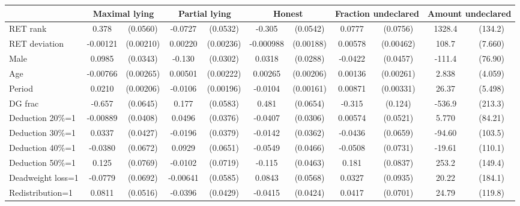 \begin{tabular}{l|cccccc|cc|cc}
                &\multicolumn{2}{c}{Maximal lying}&\multicolumn{2}{c}{Partial lying}&\multicolumn{2}{c}{Honest}  &\multicolumn{2}{c}{Fraction undeclared}&\multicolumn{2}{c}{Amount undeclared}\\
\hline
RET rank        &    0.378\sym{***}& (0.0560)&  -0.0727         & (0.0532)&   -0.305\sym{***}& (0.0542)&   0.0777         & (0.0756)&   1328.4\sym{***}&  (134.2)\\
RET deviation   & -0.00121         &(0.00210)&  0.00220         &(0.00236)&-0.000988         &(0.00188)&  0.00578         &(0.00462)&    108.7\sym{***}&  (7.660)\\
Male            &   0.0985\sym{***}& (0.0343)&   -0.130\sym{***}& (0.0302)&   0.0318         & (0.0288)&  -0.0422         & (0.0457)&   -111.4         &  (76.90)\\
Age             & -0.00766\sym{***}&(0.00265)&  0.00501\sym{**} &(0.00222)&  0.00265         &(0.00206)&  0.00136         &(0.00261)&    2.838         &  (4.059)\\
Period          &   0.0210\sym{***}&(0.00206)&  -0.0106\sym{***}&(0.00196)&  -0.0104\sym{***}&(0.00161)&  0.00871\sym{***}&(0.00331)&    26.37\sym{***}&  (5.498)\\
DG frac         &   -0.657\sym{***}& (0.0645)&    0.177\sym{***}& (0.0583)&    0.481\sym{***}& (0.0654)&   -0.315\sym{**} &  (0.124)&   -536.9\sym{**} &  (213.3)\\
Deduction 20\%=1& -0.00889         & (0.0408)&   0.0496         & (0.0376)&  -0.0407         & (0.0306)&  0.00574         & (0.0521)&    5.770         &  (84.21)\\
Deduction 30\%=1&   0.0337         & (0.0427)&  -0.0196         & (0.0379)&  -0.0142         & (0.0362)&  -0.0436         & (0.0659)&   -94.60         &  (103.5)\\
Deduction 40\%=1&  -0.0380         & (0.0672)&   0.0929         & (0.0651)&  -0.0549         & (0.0466)&  -0.0508         & (0.0731)&   -19.61         &  (110.1)\\
Deduction 50\%=1&    0.125         & (0.0769)&  -0.0102         & (0.0719)&   -0.115\sym{**} & (0.0463)&    0.181\sym{**} & (0.0837)&    253.2\sym{*}  &  (149.4)\\
Deadweight loss=1&  -0.0779         & (0.0692)& -0.00641         & (0.0585)&   0.0843         & (0.0568)&   0.0327         & (0.0935)&    20.22         &  (184.1)\\
Redistribution=1&   0.0811         & (0.0516)&  -0.0396         & (0.0429)&  -0.0415         & (0.0424)&   0.0417         & (0.0701)&    24.79         &  (119.8)\\

\end{tabular}
